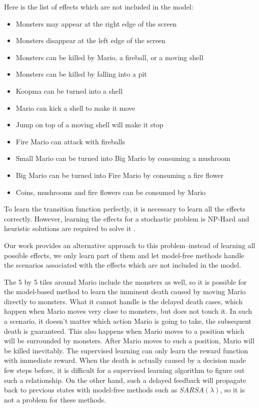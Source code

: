 Here is the list of effects which are not included in the model:
\begin{itemize}
\item Monsters may appear at the right edge of the screen
\item Monsters disappear at the left edge of the screen
\item Monsters can be killed by Mario, a fireball, or a moving shell
\item Monsters can be killed by falling into a pit
\item Koopma can be turned into a shell
\item Mario can kick a shell to make it move
\item Jump on top of a moving shell will make it stop
\item Fire Mario can attack with fireballs
\item Small Mario can be turned into Big Mario by consuming a mushroom
\item Big Mario can be turned into Fire Mario by consuming a fire flower
\item Coins, mushrooms and fire flowers can be consumed by Mario
\end{itemize}

To learn the transition function perfectly, it is necessary to 
learn all the effects correctly. However, learning the effects for a stochastic
problem is NP-Hard \cite{Walsh09} and heuristic solutions are required
to solve it \cite{Pasula07}.

Our work provides an alternative approach to this problem--instead of learning 
all possible effects, we only learn part of them and 
let model-free methods handle the scenarios associated with
the effects which are not included in the model.

The 5 by 5 tiles around Mario include the monsters as well,
so it is possible for the model-based method to learn the imminent
death caused by moving Mario directly to monsters. What it cannot handle is the delayed death cases, which happen when
Mario moves very close to monsters, but does not touch it.
In such a scenario, it doesn't matter which action Mario is going to take, 
the subsequent death is guaranteed. 
This also happens when Mario moves to a position which will be surrounded by
monsters. After Mario moves to such a position, Mario will be killed inevitably.
The supervised learning can only learn the reward function with immediate reward.
When the death is actually caused by a decision made few steps before, it is difficult
for a supervised learning algorithm to figure out such a relationship. 
On the other hand, such a delayed feedback will propagate back to previous states with model-free methods
such as $SARSA(\lambda)$, so it is not a problem for these methods.

